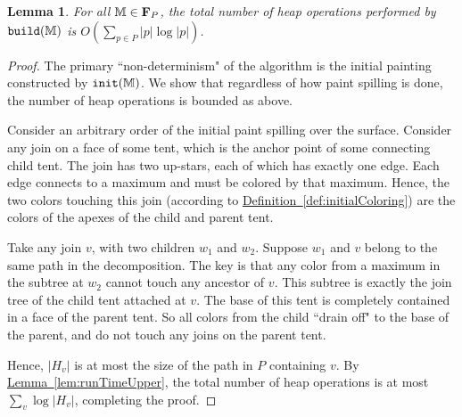 \documentclass[11pt]{article}
\newtheorem{lemma}[theorem]{Lemma}
\theoremstyle{definition}
\newcommand{\bF}{{\bf F}}
\newcommand{\MM}{\mathbb{M}}
\newcommand{\Lem}[1]{\hyperref[lem:#1]{Lemma~\ref*{lem:#1}}} %
\newcommand{\Def}[1]{\hyperref[def:#1]{Definition~\ref*{def:#1}}} %
\newcommand{\build}{{\tt build}}
\newcommand{\init}{{\tt init}}
\begin{document}
\begin{lemma}
\label{lem:cost}
For all $\MM \in \bF_P$, the total number of heap operations performed by $\build(\MM)$ is $O(\sum_{p\in P} |p|\log|p|)$.
\end{lemma}
\begin{proof}
The primary ``non-determinism" of the algorithm is the initial painting constructed by $\init(\MM)$. 
We show that regardless of how paint spilling is done, the number of heap operations is bounded as above.

 Consider an arbitrary order of the initial paint spilling over the surface.
 Consider any join on a face of some tent, which is the anchor point of some connecting child tent.  
 The join has two up-stars, each of which has exactly one edge. Each edge connects to a maximum
 and must be colored by that maximum.
 Hence, the two colors touching this join (according to \Def{initialColoring})
 are the colors of the apexes of the child and parent tent.  
% 
 
 Take any join $v$, with two children $w_1$ and $w_2$. Suppose $w_1$ and $v$ belong to the same path
 in the decomposition. The key is that any color from a maximum in the subtree at $w_2$ cannot touch
 any ancestor of $v$. This subtree is exactly the join tree of the child tent attached at $v$.
 The base of this tent is completely contained in a face of the parent tent. So all colors
 from the child ``drain off" to the base of the parent, and do not touch any joins on the parent tent.
 
 Hence, $|H_v|$ is at most the size of the path in $P$ containing $v$. By \Lem{runTimeUpper}, the total number of heap operations
 is at most $\sum_v \log |H_v|$, completing the proof.
 

\end{proof}
\end{document}
